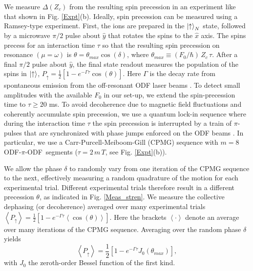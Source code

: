 \documentclass[aps,prl,twocolumn,superscriptaddress,floatfix]{revtex4-1}
\begin{document}
We measure $\Delta(Z_c)$ from the resulting spin precession in an experiment like that shown in Fig. \ref{Expt}(b). Ideally, spin precession can be measured using a Ramsey-type experiment. First, the ions are prepared in the $\ket{\uparrow}_N$ state, followed by a microwave $\pi/2$ pulse about $\hat{y}$ that rotates the spins to the $\hat{x}$ axis. The spins precess for an interaction time $\tau$ so that the resulting spin precession on resonance $(\mu = \omega)$ is $\theta = \theta_{max} \cos(\delta)$, where $\theta_{max} \equiv (F_{0}/\hbar)\, Z_c \, \tau$. After a final $\pi/2$ pulse about $\hat{y}$, the final state readout measures the population of the spins in $\ket{\uparrow}$, $P_{\uparrow} = \frac{1}{2}[1-e^{-\Gamma \tau}\cos(\theta)]$. Here $\Gamma$ is the decay rate from spontaneous emission from the off-resonant ODF laser beams \citep{Uys2010}. To detect small amplitudes with the available $F_0$ in our set-up, we extend the spin-precession time to $\tau \ge 20$ ms. To avoid decoherence due to magnetic field fluctuations and coherently accumulate spin precession, we use a quantum lock-in \citep{Kotler2011} sequence where during the interaction time $\tau$ the spin precession is interrupted by a train of $\pi$-pulses that are synchronized with phase jumps enforced on the ODF beams \citep{SuppMat}. In particular, we use a Carr-Purcell-Meiboom-Gill (CPMG) sequence with $m = 8$ \mbox{ODF-$\pi$-ODF segments} ($\tau = 2\, m \, T$, see Fig. \ref{Expt}(b)).

We allow the phase $\delta$ to randomly vary from one iteration of the CPMG sequence to the next, effectively measuring a random quadrature of the motion for each experimental trial. Different experimental trials therefore result in a different precession $\theta$, as indicated in Fig. \ref{Meas_stren}. We measure the collective dephasing (or decoherence) averaged over many experimental trials $\left< P_{\uparrow} \right> = \frac{1}{2}[1-e^{-\Gamma \tau} \left<\cos(\theta)\right>]$. Here the brackets $ \left< \cdot \right> $ denote an average over many iterations of the CPMG sequence. Averaging over the random phase $\delta$ yields~\citep{Kotler2013}
\begin{equation}
\left< P_{\uparrow} \right> = \frac{1}{2} \left[ 1-e^{-\Gamma \tau}J_0(\theta_{max}) \right],
\label{Bessel}
\end{equation}
with $J_0$ the zeroth-order Bessel function of the first kind.
\end{document}
